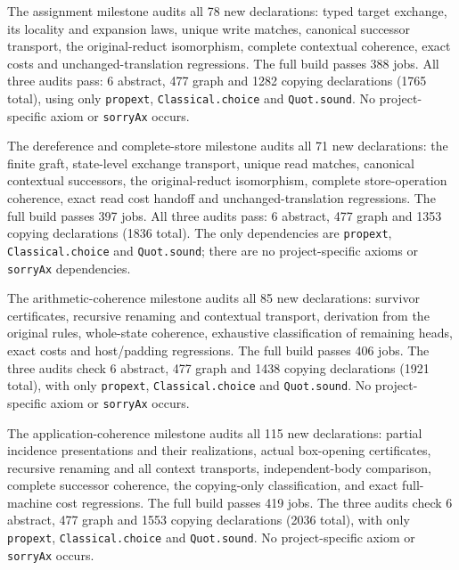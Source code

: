 The assignment milestone audits all 78 new declarations: typed target exchange,
its locality and expansion laws, unique write matches, canonical successor
transport, the original-reduct isomorphism, complete contextual coherence,
exact costs and unchanged-translation regressions. The full build passes
388 jobs. All three audits pass: 6 abstract, 477 graph and 1282 copying
declarations (1765 total), using only \texttt{propext}, \texttt{Classical.choice}
and \texttt{Quot.sound}. No project-specific axiom or \texttt{sorryAx} occurs.


The dereference and complete-store milestone audits all 71 new declarations:
the finite graft, state-level exchange transport, unique read matches,
canonical contextual successors, the original-reduct isomorphism, complete
store-operation coherence, exact read cost handoff and unchanged-translation
regressions. The full build passes 397 jobs. All three audits pass: 6 abstract,
477 graph and 1353 copying declarations (1836 total). The only dependencies
are \texttt{propext}, \texttt{Classical.choice} and \texttt{Quot.sound};
there are no project-specific axioms or \texttt{sorryAx} dependencies.

The arithmetic-coherence milestone audits all 85 new declarations: survivor
certificates, recursive renaming and contextual transport, derivation from the
original rules, whole-state coherence, exhaustive classification of remaining
heads, exact costs and host/padding regressions. The full build passes 406 jobs.
The three audits check 6 abstract, 477 graph and 1438 copying declarations
(1921 total), with only \texttt{propext}, \texttt{Classical.choice} and
\texttt{Quot.sound}. No project-specific axiom or \texttt{sorryAx} occurs.

The application-coherence milestone audits all 115 new declarations: partial
incidence presentations and their realizations, actual box-opening certificates,
recursive renaming and all context transports, independent-body comparison,
complete successor coherence, the copying-only classification, and exact
full-machine cost regressions. The full build passes 419 jobs. The three audits
check 6 abstract, 477 graph and 1553 copying declarations (2036 total), with only
\texttt{propext}, \texttt{Classical.choice} and \texttt{Quot.sound}. No
project-specific axiom or \texttt{sorryAx} occurs.


